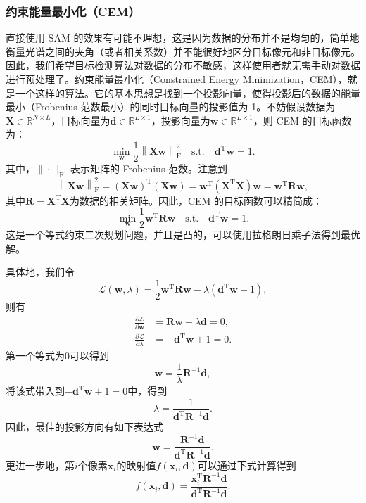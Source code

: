 \subsubsection{约束能量最小化（CEM）}
直接使用 SAM 的效果有可能不理想，这是因为数据的分布并不是均匀的，简单地衡量光谱之间的夹角（或者相关系数）并不能很好地区分目标像元和非目标像元。因此，我们希望目标检测算法对数据的分布不敏感，这样使用者就无需手动对数据进行预处理了。约束能量最小化（Constrained Energy Minimization，CEM），就是一个这样的算法。它的基本思想是找到一个投影向量，使得投影后的数据的能量最小（Frobenius 范数最小）的同时目标向量的投影值为 1。不妨假设数据为\(\mathbf{X} \in \mathbb{R}^{N \times L}\)，目标向量为\(\mathbf{d} \in \mathbb{R}^{L \times 1}\)，投影向量为\(\mathbf{w} \in \mathbb{R}^{L \times 1}\)，则 CEM 的目标函数为：
\[
    \min_{\mathbf{w}} \frac{1}{2}\left\| \mathbf{X} \mathbf{w} \right\|_{\mathrm{F}}^{2} \quad \text{s.t.} \quad \mathbf{d}^{\mathrm{T}}\mathbf{w} = 1. 
\]
其中，\(\|\cdot\|_{\mathrm{F}}\) 表示矩阵的 Frobenius 范数。注意到
\[
    \left\| \mathbf{X} \mathbf{w} \right\|_{\mathrm{F}}^{2} = (\mathbf{X} \mathbf{w})^{\mathrm{T}}(\mathbf{X} \mathbf{w}) = \mathbf{w}^{\mathrm{T}}(\mathbf{X}^{\mathrm{T}}\mathbf{X})\mathbf{w} = \mathbf{w}^{\mathrm{T}}\mathbf{R}\mathbf{w},
\]
其中\(\mathbf{R} = \mathbf{X}^{\mathrm{T}}\mathbf{X}\)为数据的相关矩阵。因此，CEM 的目标函数可以精简成：
\[
    \min_{\mathbf{w}} \frac{1}{2} \mathbf{w}^{\mathrm{T}}\mathbf{R}\mathbf{w} \quad \text{s.t.} \quad \mathbf{d}^{\mathrm{T}}\mathbf{w} = 1.    
\]
这是一个等式约束二次规划问题，并且是凸的，可以使用拉格朗日乘子法得到最优解。

具体地，我们令
\[
    \mathcal{L}(\mathbf{w}, \lambda) = \frac{1}{2} \mathbf{w}^{\mathrm{T}}\mathbf{R}\mathbf{w} - \lambda\left(\mathbf{d}^{\mathrm{T}}\mathbf{w} - 1\right),
\]
则有
\[
    \begin{aligned}
        \frac{\partial \mathcal{L}}{\partial \mathbf{w}} & = \mathbf{R}\mathbf{w} - \lambda\mathbf{d} = 0, \\
        \frac{\partial \mathcal{L}}{\partial \lambda}    & = -\mathbf{d}^{\mathrm{T}}\mathbf{w} + 1 = 0.
    \end{aligned}
\]
第一个等式为0可以得到
\[
    \mathbf{w} = \frac{1}{\lambda}\mathbf{R}^{-1}\mathbf{d},  
\]
将该式带入到\(-\mathbf{d}^{\mathrm{T}}\mathbf{w} + 1 = 0\)中，得到
\[
    \lambda = \frac{1}{\mathbf{d}^{\mathrm{T}}\mathbf{R}^{-1}\mathbf{d}}.
\]
因此，最佳的投影方向有如下表达式
\[
    \mathbf{w} = \frac{\mathbf{R}^{-1}\mathbf{d}}{\mathbf{d}^{\mathrm{T}}\mathbf{R}^{-1}\mathbf{d}}.
\]
更进一步地，第\(i\)个像素\(\mathbf{x}_{i}\)的映射值\(f(\mathbf{x}_{i}, \mathbf{d})\)可以通过下式计算得到
\begin{equation}
    f(\mathbf{x}_{i}, \mathbf{d}) = \frac{\mathbf{x}_{i}^{\mathrm{T}}\mathbf{R}^{-1}\mathbf{d}}{\mathbf{d}^{\mathrm{T}}\mathbf{R}^{-1}\mathbf{d}}.
\end{equation}

